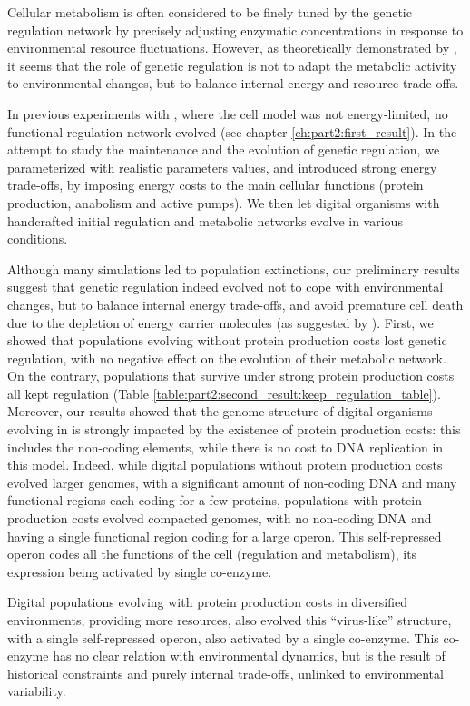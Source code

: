 Cellular metabolism is often considered to be finely tuned by the genetic regulation network by precisely adjusting enzymatic concentrations in response to environmental resource fluctuations.
However, as theoretically demonstrated by \cite{weisse-et-al-2015}, it seems that the role of genetic regulation is not to adapt the metabolic activity to environmental changes, but to balance internal energy and resource trade-offs.

In previous experiments with {\EvoEvoSim} \citep{rocabert-et-al-2017}, where the cell model was not energy-limited, no functional regulation network evolved (see chapter \ref{ch:part2:first_result}). In the attempt to study the maintenance and the evolution of genetic regulation, we parameterized {\EvoEvoSim} with realistic parameters values, and introduced strong energy trade-offs, by imposing energy costs to the main cellular functions (protein production, anabolism and active pumps). We then let digital organisms with handcrafted initial regulation and metabolic networks evolve in various conditions.

Although many simulations led to population extinctions, our preliminary results suggest that genetic regulation indeed evolved not to cope with environmental changes, but to balance internal energy trade-offs, and avoid premature cell death due to the depletion of energy carrier molecules (as suggested by \citealt{weisse-et-al-2015}). First, we showed that populations evolving without protein production costs lost genetic regulation, with no negative effect on the evolution of their metabolic network. On the contrary, populations that survive under strong protein production costs all kept regulation (Table \ref{table:part2:second_result:keep_regulation_table}). Moreover, our results showed that the genome structure of digital organisms evolving in {\EvoEvoSim} is strongly impacted by the existence of protein production costs: this includes the non-coding elements, while there is no cost to DNA replication in this model. Indeed, while digital populations without protein production costs evolved larger genomes, with a significant amount of non-coding DNA and many functional regions each coding for a few proteins, populations with protein production costs evolved compacted genomes, with no non-coding DNA and having a single functional region coding for a large operon. This self-repressed operon codes all the functions of the cell (regulation and metabolism), its expression being activated by single co-enzyme.

Digital populations evolving with protein production costs in diversified environments, providing more resources, also evolved this ``virus-like'' structure, with a single self-repressed operon, also activated by a single co-enzyme. This co-enzyme has no clear relation with environmental dynamics, but is the result of historical constraints and purely internal trade-offs, unlinked to environmental variability.

